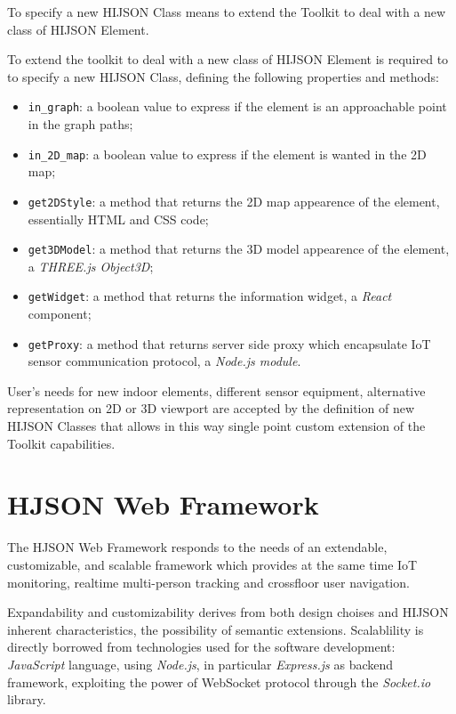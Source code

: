 \documentclass[]{article}
\begin{document}
To specify a new HIJSON Class means to extend the Toolkit to deal with a
new class of HIJSON Element.

To extend the toolkit to deal with a new class of HIJSON Element is
required to to specify a new HIJSON Class, defining the following
properties and methods:

\begin{itemize}
\item
  \texttt{in\_graph}: a boolean value to express if the element is an
  approachable point in the graph paths;
\item
  \texttt{in\_2D\_map}: a boolean value to express if the element is
  wanted in the 2D map;
\item
  \texttt{get2DStyle}: a method that returns the 2D map appearence of
  the element, essentially HTML and CSS code;
\item
  \texttt{get3DModel}: a method that returns the 3D model appearence of
  the element, a \emph{THREE.js Object3D};
\item
  \texttt{getWidget}: a method that returns the information widget, a
  \emph{React} component;
\item
  \texttt{getProxy}: a method that returns server side proxy which
  encapsulate IoT sensor communication protocol, a \emph{Node.js
  module}.
\end{itemize}

User's needs for new indoor elements, different sensor equipment,
alternative representation on 2D or 3D viewport are accepted by the
definition of new HIJSON Classes that allows in this way single point
custom extension of the Toolkit capabilities.

\section{HJSON Web Framework}\label{hjson-web-framework}

The HJSON Web Framework responds to the needs of an extendable,
customizable, and scalable framework which provides at the same time IoT
monitoring, realtime multi-person tracking and crossfloor user
navigation.

Expandability and customizability derives from both design choises and
HIJSON inherent characteristics, the possibility of semantic extensions.
Scalablility is directly borrowed from technologies used for the
software development: \emph{JavaScript} language, using \emph{Node.js},
in particular \emph{Express.js} as backend framework, exploiting the
power of WebSocket protocol through the \emph{Socket.io} library.
\end{document}
